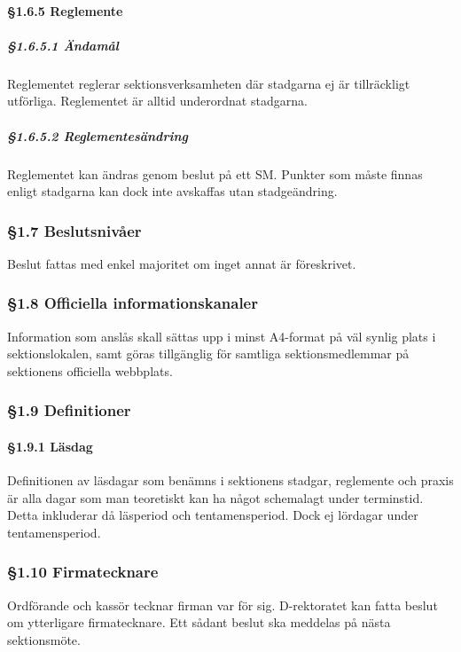 \paragraph{§1.6.5 Reglemente}

\subparagraph{§1.6.5.1 Ändamål}

Reglementet reglerar sektionsverksamheten där stadgarna ej är tillräckligt utförliga. Reglementet är alltid underordnat stadgarna.

\subparagraph{§1.6.5.2 Reglementesändring}

Reglementet kan ändras genom beslut på ett SM. Punkter som måste finnas enligt stadgarna kan dock inte avskaffas utan stadgeändring.

\subsubsection{§1.7 Beslutsnivåer}

Beslut fattas med enkel majoritet om inget annat är föreskrivet.

\subsubsection{§1.8 Officiella informationskanaler}

Information som anslås skall sättas upp i minst A4-format på väl synlig plats i sektionslokalen, samt göras tillgänglig för samtliga sektionsmedlemmar på sektionens officiella webbplats.

\subsubsection{§1.9 Definitioner}

\paragraph{§1.9.1 Läsdag}

Definitionen av läsdagar som benämns i sektionens stadgar, reglemente och praxis är alla dagar som man teoretiskt kan ha något schemalagt under terminstid. Detta inkluderar då läsperiod och tentamensperiod. Dock ej lördagar under tentamensperiod.

\subsubsection{§1.10 Firmatecknare}

Ordförande och kassör tecknar firman var för sig. D-rektoratet kan fatta beslut om ytterligare firmatecknare. Ett sådant beslut ska meddelas på nästa sektionsmöte.

